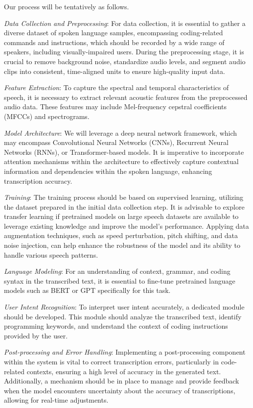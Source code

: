 Our process will be tentatively as follows.

{\em Data Collection and Preprocessing}: For data collection, it is essential to gather a diverse dataset of spoken language samples, encompassing coding-related commands and instructions, which should be recorded by a wide range of speakers, including visually-impaired users. During the preprocessing stage, it is crucial to remove background noise, standardize audio levels, and segment audio clips into consistent, time-aligned units to ensure high-quality input data.

{\em Feature Extraction}: To capture the spectral and temporal characteristics of speech, it is necessary to extract relevant acoustic features from the preprocessed audio data. These features may include Mel-frequency cepstral coefficients (MFCCs) and spectrograms.

{\em Model Architecture}: We will leverage a deep neural network framework, which may encompass Convolutional Neural Networks (CNNs), Recurrent Neural Networks (RNNs), or Transformer-based models. It is imperative to incorporate attention mechanisms within the architecture to effectively capture contextual information and dependencies within the spoken language, enhancing transcription accuracy.

{\em Training}: The training process should be based on supervised learning,
utilizing the dataset prepared in the initial data collection step.
It is advisable to explore transfer learning if pretrained models on
large speech datasets are available to leverage existing knowledge and
improve the model's performance. Applying data augmentation techniques, such as speed perturbation, pitch shifting, and data noise injection, can help enhance the robustness of the model and its ability to handle various speech patterns.

{\em Language Modeling}: For an understanding of context, grammar, and
coding syntax in the transcribed text, it is essential to fine-tune
pretrained language models such as BERT or GPT specifically for this
task.

{\em User Intent Recognition}: To interpret user intent accurately, a
dedicated module should be developed. This module should analyze the
transcribed text, identify programming keywords, and understand the
context of coding instructions provided by the user.

{\em Post-processing and Error Handling}: Implementing a post-processing
component within the system is vital to correct transcription errors,
particularly in code-related contexts, ensuring a high level of
accuracy in the generated text. Additionally, a mechanism should be
in place to manage and provide feedback when the model encounters
uncertainty about the accuracy of transcriptions, allowing for
real-time adjustments.

